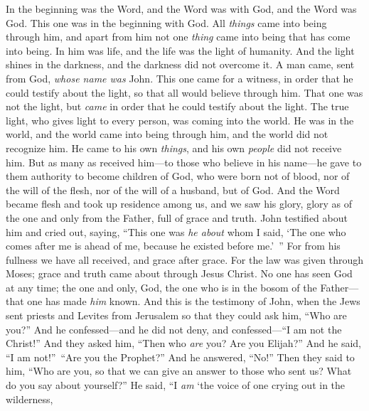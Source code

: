 
\begin{biblechapter} %
 In the beginning was the Word, and the Word was with God, and the Word was God.
\verse This one was in the beginning with God.
\verse All \textit{things} came into being through him, and apart from him not one \textit{thing} came into being that has come into being.
\verse In him was life, and the life was the light of humanity.
\verse And the light shines in the darkness, and the darkness did not overcome it.
\verse A man came, sent from God, \textit{whose name was} John.
\verse This one came for a witness, in order that he could testify about the light, so that all would believe through him.
\verse That one was not the light, but \textit{came} in order that he could testify about the light.
\verse The true light, who gives light to every person, was coming into the world.
\verse He was in the world, and the world came into being through him, and the world did not recognize him.
\verse He came to his own \textit{things}, and his own \textit{people} did not receive him.
\verse But as many as received him—to those who believe in his name—he gave to them authority to become children of God,
\verse who were born not of blood, nor of the will of the flesh, nor of the will of a husband, but of God.
\verse And the Word became flesh and took up residence among us, and we saw his glory, glory as of the one and only from the Father, full of grace and truth.
\verse John testified about him and cried out, saying, “This one was \textit{he about} whom I said, ‘The one who comes after me is ahead of me, because he existed before me.’ ”
\verse For from his fullness we have all received, and grace after grace.
\verse For the law was given through Moses; grace and truth came about through Jesus Christ.
\verse No one has seen God at any time; the one and only, God, the one who is in the bosom of the Father—that one has made \textit{him} known.
 And this is the testimony of John, when the Jews sent priests and Levites from Jerusalem so that they could ask him, “Who are you?”
\verse And he confessed—and he did not deny, and confessed—“I am not the Christ!”
\verse And they asked him, “Then who \textit{are} you? Are you Elijah?” And he said, “I am not!” “Are you the Prophet?” And he answered, “No!”
\verse Then they said to him, “Who are you, so that we can give an answer to those who sent us? What do you say about yourself?”
\verse He said, “I \textit{am} ‘the voice of one crying out in the wilderness, 

\end{biblechapter}
